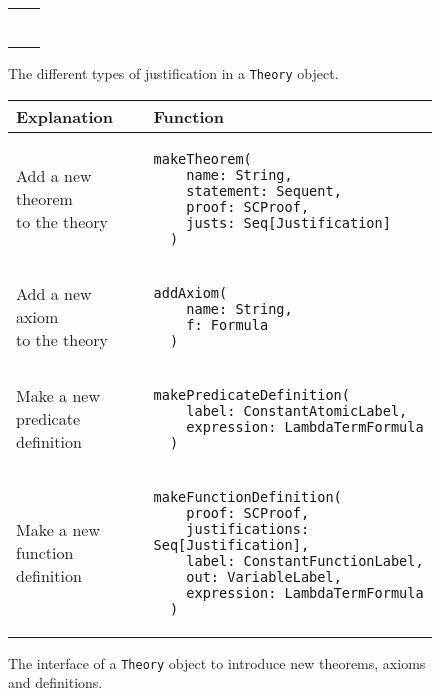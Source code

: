 {\begin{figure}[hp]
\begin{center}
\begin{tabular}{l|l}
\begin{lstlisting}[linewidth=19.5em]
          \end{lstlisting}
        \\ %
      \end{tabular}

      \caption{The different types of justification in a \lstinline|Theory|{} object.}
      \label{fig:justifications}
    \end{center}
  \end{figure}

  \begin{figure}[hp]
    \begin{center}
      \begin{tabular}{l|l}
        Explanation & Function
        \\ \hline

        \makecell[l]{Add a new theorem \\to the theory} &
          \begin{lstlisting}[linewidth=19.5em]
  makeTheorem(
    name: String,
    statement: Sequent,
    proof: SCProof,
    justs: Seq[Justification]
  )
          \end{lstlisting}
        \\ %

        \makecell[l]{Add a new axiom   \\ to the theory} &
          \begin{lstlisting}[linewidth=19.5em]
  addAxiom(
    name: String,
    f: Formula
  )
          \end{lstlisting}
        \\ %

        \makecell[l]{Make a new        \\predicate definition} &
          \begin{lstlisting}[linewidth=19.5em]
  makePredicateDefinition(
    label: ConstantAtomicLabel,
    expression: LambdaTermFormula
  )
          \end{lstlisting}
        \\ %

        \makecell[l]{Make a new        \\function definition} &
          \begin{lstlisting}[linewidth=19.5em]
  makeFunctionDefinition(
    proof: SCProof,
    justifications: Seq[Justification],
    label: ConstantFunctionLabel,
    out: VariableLabel,
    expression: LambdaTermFormula
  )
          \end{lstlisting}
        \\ %
      \end{tabular}
      \caption{The interface of a \lstinline|Theory|{} object to introduce new theorems, axioms and definitions.}


\end{center}
\end{figure}}
